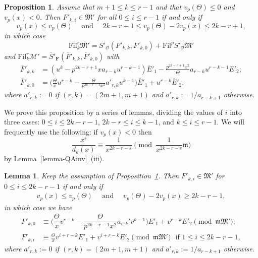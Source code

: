 \documentclass[11pt]{amsart}
\theoremstyle{definition}
\numberwithin{equation}{subsection}
\theoremstyle{plain}
\theoremstyle{plain}
\theoremstyle{plain}
\theoremstyle{plain}
\theoremstyle{plain}
\theoremstyle{plain}
\theoremstyle{plain}
\theoremstyle{plain}
\newtheorem{prop}[equation]{Proposition}
\theoremstyle{plain}
\newtheorem{lemm}[equation]{Lemma}
\theoremstyle{plain}
\theoremstyle{plain}
\theoremstyle{plain}
\theoremstyle{definition}
\theoremstyle{definition}
\theoremstyle{definition}
\theoremstyle{remark}
\renewcommand{\(}{\textup{(}}
\renewcommand{\)}{\textup{)}}
\newcommand{\F}{\mathbf{F}}
\newcommand{\barS}{\overline{S}}
\newcommand{\cM}{\mathcal{M}}
\newcommand{\fM}{\mathfrak{M}}
\newcommand{\fm}{\mathfrak{m}}
\newcommand{\Fil}{\mathrm{Fil}}
\newcommand{\cO}{\mathcal{O}}
\newcommand{\barE}{\overline{E}}
\newcommand{\barF}{\overline{F}}
\begin{document}
\begin{prop}\label{prop: Fil-Case-m+1-r-1}
Assume that $m+1\leq k\leq r-1$ and that $v_p(\Theta)\leq 0$ and $v_p(x)<0$. Then $F'_{k,i}\in\fM'$ for all $0\leq i\leq r-1$ if and only if
\begin{equation}\label{eq: condition for m+1 leq k < r}
v_p(x)\leq v_p(\Theta)\quad\mbox{ and }\quad 2k-r-1\leq v_p(\Theta)-2v_p(x)\leq 2k-r+1,
\end{equation}
in which case
$$\Fil^r_{k}\fM'=S'_\cO(F'_{k,k},F'_{k,0})+\Fil^pS'_\cO\fM'$$ and $\Fil^r_{k}\cM'=\barS'_\F(\barF'_{k,k},\barF'_{k,0})$ with
    \begin{align*}
    \barF'_{k,k} &=(u^k-p^{2k-r+1}xa_{r-k}u^{r-k-1})\barE'_1-\frac{p^{2k-r+1}x^2}{\Theta}a_{r-k}u^{r-k-1}E'_2;\\
    \barF'_{k,0} &=\bigg(\frac{\Theta}{x}u^{r-k}-\frac{\Theta}{p^{2k-r-1}x^2}a'_{r,k}u^{k-1}\bigg)\barE'_1 +u^{r-k}\barE'_2,
    \end{align*}
    where $a'_{r,k}:=0$ if $(r,k)=(2m+1,m+1)$ and $a'_{r,k}:=1/a_{r-k+1}$ otherwise.
\end{prop}

We prove this proposition by a series of lemmas, dividing the values of $i$ into three cases: $0\leq i\leq 2k-r-1$, $2k-r\leq i\leq k-1$, and $k\leq i\leq r-1$. We will frequently use the following: if $v_p(x)<0$ then
\begin{equation}\label{eq: congruence of d_k(x)}
    \frac{x^s}{d_k(x)}\equiv \frac{1}{x^{2k-r-s}} \pmod{\frac{1}{x^{2k-r-s}}\fm}
\end{equation}
by Lemma~\ref{lemma-QAinv}~(iii).

\begin{lemm}\label{lemma m+1 leq k leq r-1, 0 leq i leq 2k-r-1}
Keep the assumption of Proposition~\ref{prop: Fil-Case-m+1-r-1}. Then $F'_{k,i}\in\fM'$ for $0\leq i\leq 2k-r-1$ if and only if
\begin{align*}
    v_p(x)\leq v_p(\Theta)\quad\mbox{ and }\quad v_p(\Theta)-2v_p(x)\geq 2k-r-1,
\end{align*}
in which case we have
\begin{align*}
    F'_{k,0}&\equiv  \bigg(\dfrac{\Theta}{x}v^{r-k}-\dfrac{\Theta}{p^{2k-r-1}x^2}a_{r,k}'v^{k-1}\bigg)E'_1+v^{r-k}E'_2  \pmod{\fm\fM'};\\
    F'_{k,i}&\equiv  \frac{\Theta}{x}v^{i+r-k}E'_1+v^{i+r-k}E'_2 \pmod{\fm\fM'}\,\,\mbox{ if }1\leq i \leq 2k-r-1,
\end{align*}
where $a'_{r,k}:=0$ if $(r,k)=(2m+1,m+1)$ and $a'_{r,k}:=1/a_{r-k+1}$ otherwise.
\end{lemm}
\end{document}
